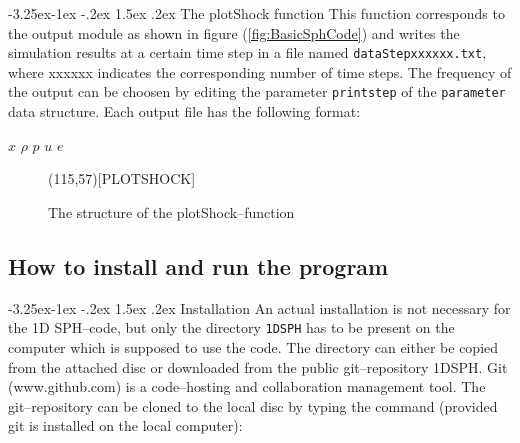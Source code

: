 \documentclass{report}
\makeatletter
\renewcommand\paragraph{\@startsection{paragraph}{4}{\z@}%
  {-3.25ex\@plus -1ex \@minus -.2ex}%
  {1.5ex \@plus .2ex}%
  {\normalfont\normalsize\bfseries}}
\makeatother
\begin{document}
\paragraph{The plotShock function}
This function corresponds to the output module as shown in figure  (\ref{fig:BasicSphCode}) and writes the simulation results at a certain time step in a file named {\tt dataStepxxxxxx.txt}, where xxxxxx indicates the corresponding number of time steps. The frequency of the output can be choosen by editing the parameter {\tt printstep} of the {\tt parameter} data structure. Each output file has the following format:

$x$ $\rho$ $p$ $u$ $e$

\begin{figure}[H]
\label{fig:plotShock_structure}  

\begin{center}
\begin{struktogramm}(115,57)[PLOTSHOCK]
  \whileend
\end{struktogramm}
\end{center}

\caption{The structure of the plotShock--function}
\end{figure}

\subsection{How to install and run the program}
\paragraph{Installation}
An actual installation is not necessary for the 1D SPH--code, but only the directory {\tt 1DSPH} has to be present on the computer which is supposed to use the code. The directory can either be copied from the attached disc or downloaded from the public git--repository 1DSPH. Git (www.github.com) is a code--hosting and collaboration management tool. The git--repository can be cloned to the local disc by typing the command (provided git is installed on the local computer):
\end{document}
